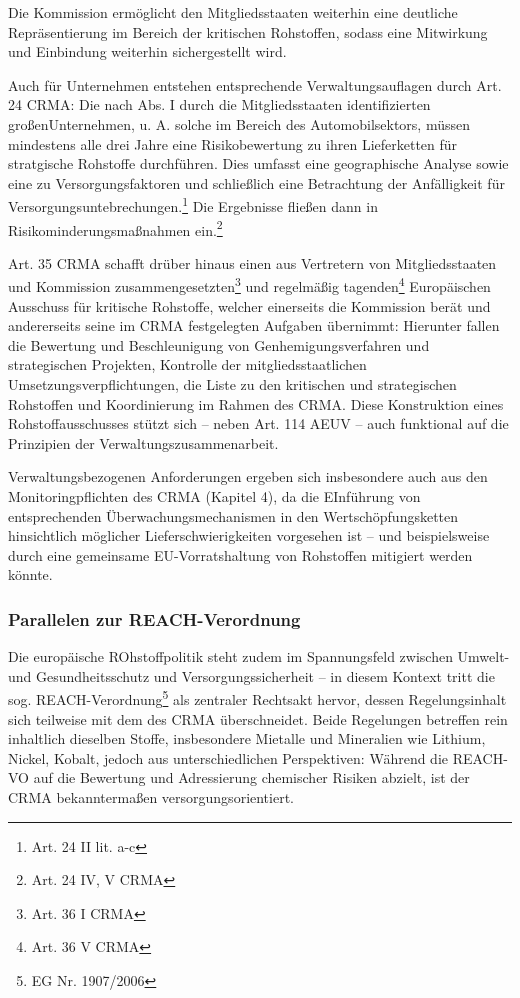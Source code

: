 \documentclass[12pt,a4paper,oneside]{book} %
\begin{document}
Die Kommission ermöglicht den Mitgliedsstaaten weiterhin eine deutliche Repräsentierung im Bereich der kritischen Rohstoffen, sodass eine Mitwirkung und Einbindung weiterhin sichergestellt wird.

Auch für Unternehmen entstehen entsprechende Verwaltungsauflagen durch Art. 24 CRMA: Die nach Abs. I durch die Mitgliedsstaaten identifizierten \glqq großen\grqq Unternehmen, u. A. solche im Bereich des Automobilsektors, müssen mindestens alle drei Jahre eine Risikobewertung zu ihren Lieferketten für stratgische Rohstoffe durchführen. Dies umfasst eine geographische Analyse sowie eine zu Versorgungsfaktoren und schließlich eine Betrachtung der Anfälligkeit für Versorgungsuntebrechungen.\footnote{Art. 24 II lit. a-c} Die Ergebnisse fließen dann in Risikominderungsmaßnahmen ein.\footnote{Art. 24 IV, V CRMA}


Art. 35 CRMA schafft drüber hinaus einen aus Vertretern von Mitgliedsstaaten und Kommission zusammengesetzten\footnote{Art. 36 I CRMA} und regelmäßig tagenden\footnote{Art. 36 V CRMA} Europäischen Ausschuss für kritische Rohstoffe, welcher einerseits die Kommission berät und andererseits seine im CRMA festgelegten Aufgaben übernimmt: Hierunter fallen die Bewertung und Beschleunigung von Genhemigungsverfahren und strategischen Projekten, Kontrolle der mitgliedsstaatlichen Umsetzungsverpflichtungen, die Liste zu den kritischen und strategischen Rohstoffen und Koordinierung im Rahmen des CRMA.
Diese Konstruktion eines Rohstoffausschusses stützt sich – neben Art. 114 AEUV – auch funktional auf die Prinzipien der Verwaltungszusammenarbeit.

Verwaltungsbezogenen Anforderungen ergeben sich insbesondere auch aus den Monitoringpflichten des CRMA (Kapitel 4), da die EInführung von entsprechenden Überwachungsmechanismen in den Wertschöpfungsketten hinsichtlich möglicher Lieferschwierigkeiten vorgesehen ist -- und beispielsweise durch eine gemeinsame EU-Vorratshaltung von Rohstoffen mitigiert werden könnte.

\subsubsection{Parallelen zur REACH-Verordnung}
Die europäische ROhstoffpolitik steht zudem im Spannungsfeld zwischen Umwelt- und Gesundheitsschutz und Versorgungssicherheit -- in diesem Kontext tritt die sog. REACH-Verordnung\footnote{EG Nr. 1907/2006} als zentraler Rechtsakt hervor, dessen Regelungsinhalt sich teilweise mit dem des CRMA überschneidet. Beide Regelungen betreffen rein inhaltlich dieselben Stoffe, insbesondere Mietalle und Mineralien wie Lithium, Nickel, Kobalt, jedoch aus unterschiedlichen Perspektiven: Während die REACH-VO auf die Bewertung und Adressierung chemischer Risiken abzielt, ist der CRMA bekanntermaßen versorgungsorientiert. 
\end{document}
